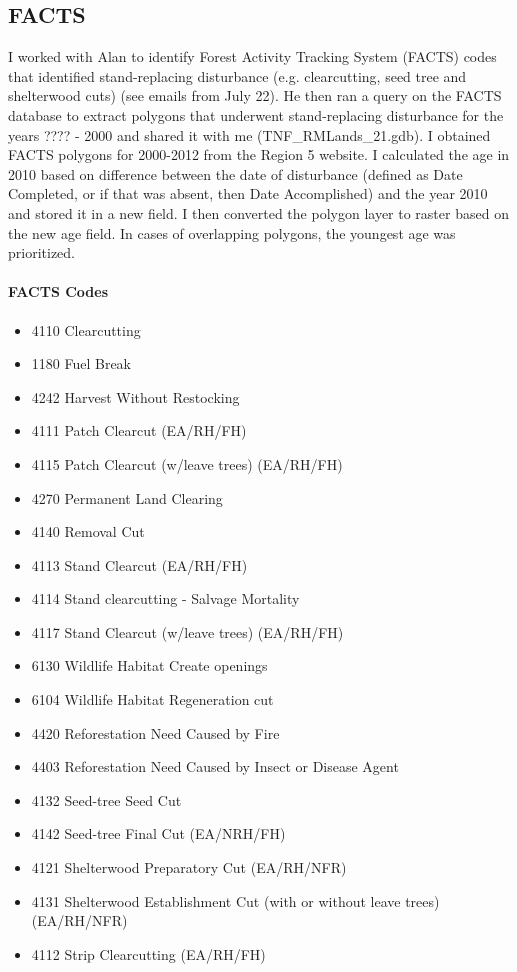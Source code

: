\subsection{FACTS} I worked with Alan to identify Forest Activity Tracking System (FACTS) codes that identified stand-replacing disturbance (e.g. clearcutting, seed tree and shelterwood cuts) (see emails from July 22). He then ran a query on the FACTS database to extract polygons that underwent stand-replacing disturbance for the years ???? - 2000 and shared it with me (TNF\_RMLands\_21.gdb). I obtained FACTS polygons for 2000-2012 from the Region 5 website. I calculated the age in 2010 based on difference between the date of disturbance (defined as Date Completed, or if that was absent, then Date Accomplished) and the year 2010 and stored it in a new field. I then converted the polygon layer to raster based on the new age field. In cases of overlapping polygons, the youngest age was prioritized.
\paragraph{FACTS Codes}
\begin{itemize}
\item 4110 Clearcutting
\item 1180 Fuel Break
\item 4242 Harvest Without Restocking
\item 4111 Patch Clearcut (EA/RH/FH)
\item 4115 Patch Clearcut (w/leave trees) (EA/RH/FH)
\item 4270 Permanent Land Clearing
\item 4140 Removal Cut
\item 4113 Stand Clearcut (EA/RH/FH)
\item 4114 Stand clearcutting - Salvage Mortality
\item 4117 Stand Clearcut (w/leave trees) (EA/RH/FH)
\item 6130 Wildlife Habitat Create openings
\item 6104 Wildlife Habitat Regeneration cut
\item 4420 Reforestation Need Caused by Fire
\item 4403 Reforestation Need Caused by Insect or Disease Agent
\item 4132 Seed-tree Seed Cut
\item 4142 Seed-tree Final Cut (EA/NRH/FH)
\item 4121 Shelterwood Preparatory Cut (EA/RH/NFR)
\item 4131 Shelterwood Establishment Cut (with or without leave trees) (EA/RH/NFR)
\item 4112 Strip Clearcutting (EA/RH/FH)
\end{itemize}

